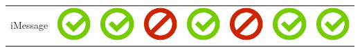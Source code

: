 \documentclass[10pt,foldmark,tumble]{leaflet}
\begin{document}
{{\begin{tabular}{ L{2cm} | C{2cm} | C{2cm} | C{2cm} | C{2cm} | C{2cm} | C{2cm} | C{2cm} | }
iMessage & \includegraphics[scale=0.1]{pics/haken.png} & \includegraphics[scale=0.1]{pics/haken.png} & \includegraphics[scale=0.1]{pics/nohaken.png} & \includegraphics[scale=0.1]{pics/haken.png} & \includegraphics[scale=0.1]{pics/nohaken.png} & \includegraphics[scale=0.1]{pics/haken.png} & \includegraphics[scale=0.1]{pics/haken.png} \tabularnewline

\end{tabular}}}
\end{document}
